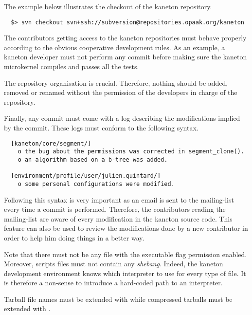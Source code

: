 The example below illustrates the checkout of the kaneton repository.

\begin{verbatim}
  $> svn checkout svn+ssh://subversion@repositories.opaak.org/kaneton
\end{verbatim}

The contributors getting access to the kaneton repositories must behave
properly according to the obvious cooperative development rules. As an
example, a kaneton developer must not perform any commit before making sure
the kaneton microkernel compiles and passes all the tests.

The repository organisation is crucial. Therefore, nothing should be
added, removed or renamed without the permission of the developers in charge
of the repository.

Finally, any commit must come with a log describing the modifications
implied by the commit. These logs must conform to the following syntax.

\begin{verbatim}
  [kaneton/core/segment/]
    o the bug about the permissions was corrected in segment_clone().
    o an algorithm based on a b-tree was added.

  [environment/profile/user/julien.quintard/]
    o some personal configurations were modified.
\end{verbatim}

Following this syntax is very important as an email is sent to the
 mailing-list every time a commit is performed.
Therefore, the contributors reading the mailing-list are aware of every
modification in the kaneton source code. This feature can also be used
to review the modifications done by a new contributor in order to help
him doing things in a better way.

Note that there must not be any file with the executable flag permission
enabled. Moreover, scripts files must not contain any \textit{shebang}.
Indeed, the kaneton development environment knows which interpreter to
use for every type of file. It is therefore a non-sense to introduce a
hard-coded path to an interpreter.

Tarball file names must be extended with  while 
compressed tarballs must be extended with .
